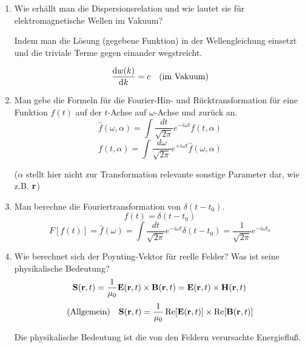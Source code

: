 \documentclass{scrartcl}
\begin{document}
\begin{enumerate}
    \item Wie erhällt man die Dispersionsrelation und wie lautet sie für
          elektromagnetische Wellen im Vakuum?
          \begin{center}
            Indem man die Lösung (gegebene Funktion) in 
            der Wellengleichung einsetzt und die
            triviale Terme gegen einander wegstreicht.
          \end{center}
          $$\dv{w(k)}{k}=c \quad\text{(im Vakuum)}$$

    \item Man gebe die Formeln für die Fourier-Hin- und Rücktransformation
          für eine Funktion $f(t)$ auf der $t$-Achse auf $\omega$-Achse und
          zurück an.
          $$\hat f(\omega, \alpha)=\int \frac{dt}{\sqrt{2\pi}}
                           e^{-i\omega t}f(t, \alpha)$$
          $$f(t, \alpha)=\int \frac{d\omega}{\sqrt{2\pi}}
                           e^{+i\omega t}\hat f(\omega, \alpha)$$
          \begin{center}
            ($\alpha$ stellt hier nicht zur Transformation relevante 
            sonstige Parameter dar, wie z.B. $\vb r$)
          \end{center}

    \item Man berechne die Fouriertransformation von $\delta(t-t_0)$.
          $$f(t)=\delta (t-t_0)$$ 
          $$F[f(t)]=\hat f(\omega)=\int\frac{dt}{\sqrt{2\pi}}
                                   e^{-i\omega t}\delta(t-t_0)
                                   =\frac{1}{\sqrt{2\pi}}e^{-i\omega t_0}$$ 

    \item Wie berechnet sich der Poynting-Vektor für reelle Felder? Was
          ist seine physikalische Bedeutung?
          $$\vb S(\vb r,t)=\frac{1}{\mu_0}\vb E(\vb r,t)\times\vb B(\vb r,t)
          =\vb E(\vb r,t)\times \vb H(\vb r,t)$$
          $$\text{(Allgemein)}\quad\vb S(\vb r,t)=
          \frac{1}{\mu_0}\Re[\vb E(\vb r,t)]\times \Re[\vb B(\vb r,t)]$$
          
          \begin{center}
            Die physikalische Bedeutung ist die von den 
            Feldern verursachte Energiefluß.
          \end{center}


\end{enumerate}
\end{document}
